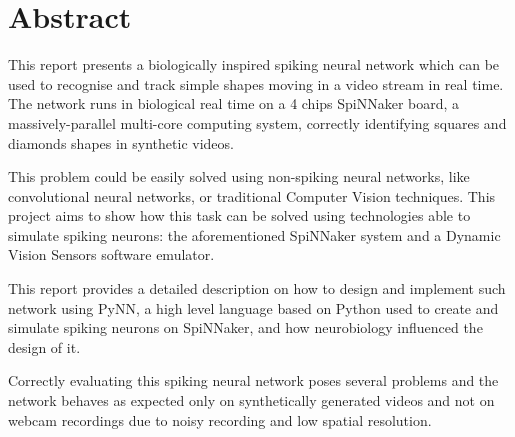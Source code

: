 \thispagestyle{plain}
\chapter*{Abstract}
This report presents a biologically inspired spiking neural network which can be used to recognise and track simple shapes moving in a video stream in real time. The network runs in biological real time on a 4 chips SpiNNaker board, a massively-parallel multi-core computing system, correctly identifying squares and diamonds shapes in synthetic videos. 

This problem could be easily solved using non-spiking neural networks, like convolutional neural networks, or traditional Computer Vision techniques. This project aims to show how this task can be solved using technologies able to simulate spiking neurons: the aforementioned SpiNNaker system and a Dynamic Vision Sensors software emulator.

This report provides a detailed description on how to design and implement such network using PyNN, a high level language based on Python used to create and simulate spiking neurons on SpiNNaker, and how neurobiology influenced the design of it. 

Correctly evaluating this spiking neural network poses several problems and the network behaves as expected only on synthetically generated videos and not on webcam recordings due to noisy recording and low spatial resolution.